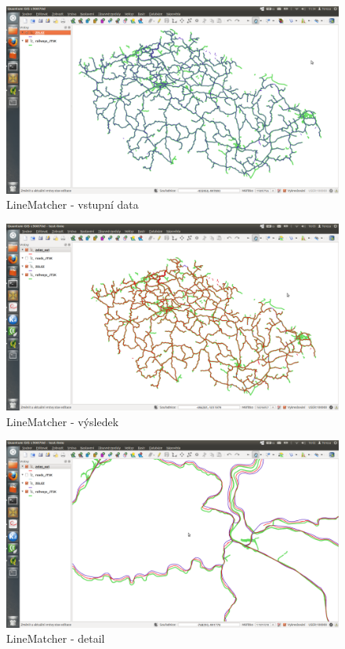  \begin{figure}[H]
    \centering
      \includegraphics[width=400pt]{./pictures/test-lm1.png}
      \caption{LineMatcher - vstupní data}
      \label{fig:lm1}
  \end{figure}

  \begin{figure}[H]
    \centering
      \includegraphics[width=400pt]{./pictures/test-lm2.png}
      \caption{LineMatcher - výsledek}
      \label{fig:lm2}
  \end{figure}  

  \begin{figure}[H]
    \centering
      \includegraphics[width=400pt]{./pictures/test-lm3.png}
      \caption{LineMatcher - detail}
      \label{fig:lm3}
  \end{figure}  

